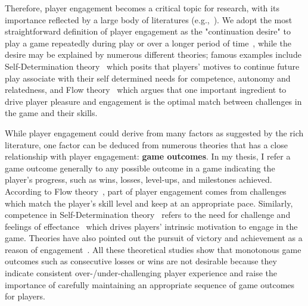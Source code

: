 Therefore, player engagement becomes a critical topic for research, with its importance reflected by a large body of literatures (e.g.,~\cite{boyle2012engagement,schoenau2011player,choi2004people,brockmyer2009development}). We adopt the most straightforward definition of player engagement as the "continuation desire" to play a game repeatedly during play or over a longer period of time~\cite{schoenau2011player}, while the desire may be explained by numerous different theories; famous examples include Self-Determination theory~\cite{przybylski2010motivational,ryan2006motivational} which posits that players' motives to continue future play associate with their self determined needs for competence, autonomy and relatedness, and Flow theory~\cite{sweetser2005gameflow,flow1990psychology,chen2007flow} which argues that one important ingredient to drive player pleasure and engagement is the optimal match between challenges in the game and their skills.

While player engagement could derive from many factors as suggested by the rich literature, one factor can be deduced from numerous theories that has a close relationship with player engagement: \textbf{game outcomes}. In my thesis, I refer a game outcome generally to any possible outcome in a game indicating the player's progress, such as wins, losses, level-ups, and milestones achieved. According to Flow theory~\cite{sweetser2005gameflow,flow1990psychology,chen2007flow}, part of player engagement comes from challenges which match the player's skill level and keep at an appropriate pace. Similarly, competence in Self-Determination theory~\cite{przybylski2010motivational,ryan2006motivational} refers to the need for challenge and feelings of effectance~\cite{deci1985intrinsic,white1959motivation} which drives players' intrinsic motivation to engage in the game.  Theories have also pointed out the pursuit of victory and achievement as a reason of engagement~\cite{schoenau2011player,yee2006motivations,sherry2006video,wu2010falling,lazzaro2004we}. All these theoretical studies show that monotonous game outcomes such as consecutive losses or wins are not desirable because they indicate consistent over-/under-challenging player experience and raise the importance of carefully maintaining an appropriate sequence of game outcomes for players.

